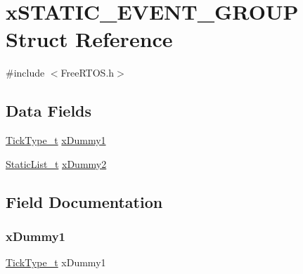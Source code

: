 \hypertarget{structx_s_t_a_t_i_c___e_v_e_n_t___g_r_o_u_p}{}\section{x\+S\+T\+A\+T\+I\+C\+\_\+\+E\+V\+E\+N\+T\+\_\+\+G\+R\+O\+UP Struct Reference}
\label{structx_s_t_a_t_i_c___e_v_e_n_t___g_r_o_u_p}


{\ttfamily \#include $<$Free\+R\+T\+O\+S.\+h$>$}

\subsection*{Data Fields}
\begin{DoxyCompactItemize}
\item 
\mbox{\hyperlink{portmacro_8h_aa69c48c6e902ce54f70886e6573c92a9}{Tick\+Type\+\_\+t}} \mbox{\hyperlink{structx_s_t_a_t_i_c___e_v_e_n_t___g_r_o_u_p_a7eacc6e12219b6aee0a8838ae4d5fa67}{x\+Dummy1}}
\item 
\mbox{\hyperlink{_free_r_t_o_s_8h_a9735ad9101a2bd25f83a62089a4acee6}{Static\+List\+\_\+t}} \mbox{\hyperlink{structx_s_t_a_t_i_c___e_v_e_n_t___g_r_o_u_p_ad8843df8638b72338cada5065facc7ea}{x\+Dummy2}}
\end{DoxyCompactItemize}


\subsection{Field Documentation}
\mbox{\label{structx_s_t_a_t_i_c___e_v_e_n_t___g_r_o_u_p_a7eacc6e12219b6aee0a8838ae4d5fa67}} 
\subsubsection{\texorpdfstring{xDummy1}{xDummy1}}
{\footnotesize\ttfamily \mbox{\hyperlink{portmacro_8h_aa69c48c6e902ce54f70886e6573c92a9}{Tick\+Type\+\_\+t}} x\+Dummy1}

\mbox{\label{structx_s_t_a_t_i_c___e_v_e_n_t___g_r_o_u_p_ad8843df8638b72338cada5065facc7ea}} 
